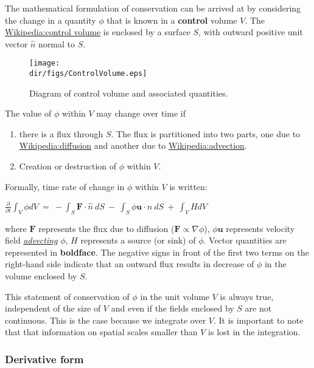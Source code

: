 The mathematical formulation of conservation can be arrived at by
considering the change in a quantity $\phi$ that is known in a
\textbf{control} volume $V$. The
\href{Wikipedia:control volume}{Wikipedia:control volume} is enclosed by
a surface $S$, with outward positive unit vector $\hat n$ normal to $S$.


\begin{figure}
  \begin{center}
    \texttt{[image: \\dir/figs/ControlVolume.eps]}
  \end{center}
  \caption{Diagram of control volume and associated quantities.}
  \label{fig:controlvol}
\end{figure} 


The value of $\phi$ within $V$ may change over time if

\begin{enumerate}
\itemsep1pt\parskip0pt
\item
  there is a flux through $S$. The flux is partitioned into two parts,
  one due to \url{Wikipedia:diffusion} and another due to
  \url{Wikipedia:advection}.
\item
  Creation or destruction of $\phi$ within $V$.
\end{enumerate}

Formally, time rate of change in $\phi$ within $V$ is written:

$
{\frac{ \partial }{ \partial t}} { \int }_{ V} \phi dV~ = ~ -{ \int }_{ S} {\mathbf F}
    {\cdot} \hat n~ dS~ - ~{ \int }_{ S} \phi {\mathbf u} {\cdot} \hat n ~ dS~
    + ~{ \int }_{ V} HdV
$

where ${\mathbf F}$ represents the flux due to diffusion
($\mathbf{F} \propto \nabla \phi$), $\phi {\mathbf u}$ represents
velocity field \emph{\href{Wikipedia:advection}{advecting}} $\phi$, $H$
represents a source (or sink) of $\phi$. Vector quantities are
represented in \textbf{boldface}. The negative signs in front of the
first two terms on the right-hand side indicate that an outward flux
results in decrease of $\phi$ in the volume enclosed by $S$.

This statement of conservation of $\phi$ in the unit volume $V$ is
always true, independent of the size of $V$ and even if the fields
enclosed by $S$ are not continuous. This is the case because we
integrate over $V$. It is important to note that that information on
spatial scales smaller than $V$ is lost in the integration.

\subsubsection{Derivative form}

